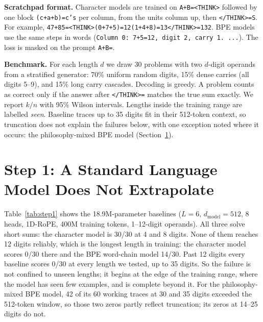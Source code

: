 \documentclass[10pt,twocolumn]{article}
\begin{document}
\textbf{Scratchpad format.} Character models are trained on \texttt{A+B=<THINK>} followed by one block \texttt{(c+a+b)=c's} per column, from the units column up, then \texttt{</THINK>=S}. For example, \texttt{47+85=<THINK>(0+7+5)=12(1+4+8)=13</THINK>=132}. BPE models use the same steps in words (\texttt{Column 0: 7+5=12, digit 2, carry 1. ...}). The loss is masked on the prompt \texttt{A+B=}.

\textbf{Benchmark.} For each length $d$ we draw 30 problems with two $d$-digit operands from a stratified generator: 70\% uniform random digits, 15\% dense carries (all digits 5--9), and 15\% long carry cascades. Decoding is greedy. A problem counts as correct only if the answer after \texttt{</THINK>=} matches the true sum exactly. We report $k/n$ with 95\% Wilson intervals. Lengths inside the training range are labelled \emph{seen}. Baseline traces up to 35 digits fit in their 512-token context, so truncation does not explain the failures below, with one exception noted where it occurs: the philosophy-mixed BPE model (Section~\ref{sec:step1}).

\section{Step 1: A Standard Language Model Does Not Extrapolate}\label{sec:step1}

Table~\ref{tab:step1} shows the 18.9M-parameter baselines ($L=6$, $d_{\text{model}}=512$, 8 heads, 1D-RoPE, 400M training tokens, 1--12-digit operands). All three solve short sums: the character model is 30/30 at 4 and 8 digits. None of them reaches 12 digits reliably, which is the longest length in training: the character model scores 0/30 there and the BPE word-chain model 14/30. Past 12 digits every baseline scores 0/30 at every length we tested, up to 35 digits. So the failure is not confined to unseen lengths; it begins at the edge of the training range, where the model has seen few examples, and is complete beyond it. For the philosophy-mixed BPE model, 42 of its 60 working traces at 30 and 35 digits exceeded the 512-token window, so those two zeros partly reflect truncation; its zeros at 14--25 digits do not.
\end{document}
